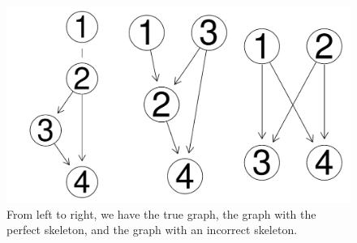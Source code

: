 \documentclass[12pt]{article}\usepackage[]{graphicx}\usepackage[]{color}
\makeatletter
\def\maxwidth{ %
  \ifdim\Gin@nat@width>\linewidth
    \linewidth
  \else
    \Gin@nat@width
  \fi
}
\newenvironment{knitrout}{}{} %
\makeatother
\begin{document}
\begin{knitrout}
\color{fgcolor}\begin{figure}
\includegraphics[width=\maxwidth]{figure/unnamed-chunk-3-1} \caption[From left to right, we have the true graph, the graph with the perfect skeleton, and the graph with an incorrect skeleton]{From left to right, we have the true graph, the graph with the perfect skeleton, and the graph with an incorrect skeleton.}\label{fig:unnamed-chunk-3}
\end{figure}

\end{knitrout}
\end{document}
